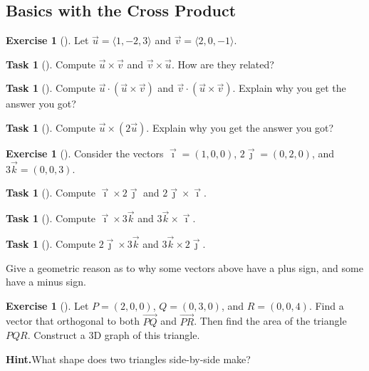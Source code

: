\documentclass[10pt,]{book}
\theoremstyle{plain}
\theoremstyle{definition}
\theoremstyle{definition}
\theoremstyle{definition}
\theoremstyle{definition}
\newtheorem{exploration}[project]{Exercise}
\newtheorem{task}[project]{Task}
\theoremstyle{definition}
\numberwithin{equation}{section}
\newcommand{\ii}{\vec \imath}
\newcommand{\jj}{\vec \jmath}
\newcommand{\kk}{\vec k}
\begin{document}
\subsection[{Basics with the Cross Product}]{Basics with the Cross Product}\label{subsection-11}
\begin{exploration}[]\label{exploration-41}
Let \(\vec u=\langle 1,-2,3\rangle\) and \(\vec v=\langle 2,0,-1\rangle\).%
\begin{task}[]\label{task-74}
Compute \(\vec u\times \vec v\) and \(\vec v\times \vec u\).  How are they related?%
\end{task}
\begin{task}[]\label{task-75}
Compute \(\vec u \cdot (\vec u\times \vec v)\) and \(\vec v \cdot (\vec u\times \vec v)\). Explain why you get the answer you got?%
\end{task}
\begin{task}[]\label{task-76}
Compute \(\vec u \times (2\vec u)\).  Explain why you get the answer you got?%
\end{task}
\end{exploration}
\begin{exploration}[]\label{exploration-42}
Consider the vectors \({\ii}=(1,0,0)\), \({2\jj}=(0,2,0)\), and \({3\kk}=(0,0,3)\).%
\begin{task}[]\label{task-77}
Compute \(\ii\times {2\jj}\) and \({2\jj}\times {\ii}\).%
\end{task}
\begin{task}[]\label{task-78}
Compute \({\ii}\times {3\kk}\) and \({3\kk}\times {\ii}\).%
\end{task}
\begin{task}[]\label{task-79}
Compute \({2\jj}\times {3\kk}\) and \({3\kk}\times {2\jj}\).%
\end{task}
\bigbreak
Give a geometric reason as to why some vectors above have a plus sign, and some have a minus sign.%
\end{exploration}
\begin{exploration}[]\label{exploration-43}
Let \(P=(2,0,0)\), \(Q=(0,3,0)\), and \(R=(0,0,4)\). Find a vector that orthogonal to both \(\vec {PQ}\) and \(\vec {PR}\). Then find the area of the triangle \(PQR\). Construct a 3D graph of this triangle.%
\par\medskip\noindent%
\textbf{Hint.}\quad What shape does two triangles side-by-side make?%
\end{exploration}
\typeout{************************************************}
\typeout{************************************************}
\end{document}
